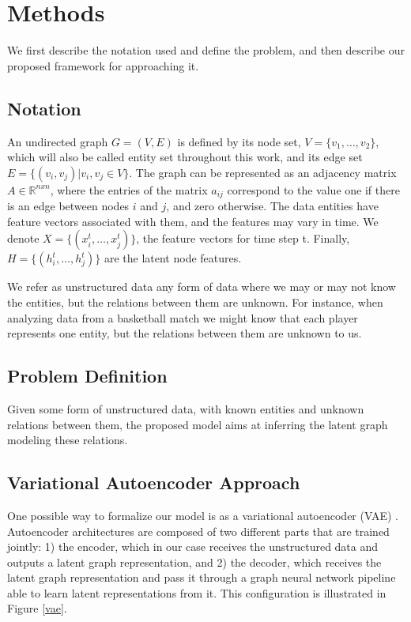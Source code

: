 \documentclass[12pt,a4paper]{article}
\begin{document}
	\section{Methods}
	\label{sec:Methods}
	
	We first describe the notation used and define the problem, and then describe our proposed framework for approaching it.
	
	\subsection{Notation}
	
	An undirected graph $G = (V,E)$ is defined by its node set, $V=\{v_1, \ldots, v_2 \}$, which will also be called entity set throughout this work, and its edge set $E=\{(v_i, v_j)|v_i, v_j \in V\}$. The graph can be represented as an adjacency matrix $A \in \mathbb{R}^{nxn}$, where the entries of the matrix $a_{ij}$  correspond to the value one if there is an edge between nodes $i$ and $j$, and zero otherwise. The data entities have feature vectors associated with them, and the features may vary in time. We denote $X=\{(x^t_i, \ldots , x^t_j)\}$, the feature vectors for time step t. Finally, $H=\{(h^t_i, \ldots , h^t_j)\}$ are the latent node features.
	
	We refer as unstructured data any form of data where we may or may not know the entities, but the relations between them are unknown. For instance, when analyzing data from a basketball match we might know that each player represents one entity, but the relations between them are unknown to us.
	
	\subsection{Problem Definition}
	
	Given some form of unstructured data, with known entities and unknown relations between them, the proposed model aims at inferring the latent graph modeling these relations. 
	
	\subsection{Variational Autoencoder Approach}
	
	One possible way to formalize our model is as a variational autoencoder (VAE) \citep{KingmaandWelling2013, Rezende2014}. Autoencoder architectures are composed of two different parts that are trained jointly: 1) the encoder, which in our case receives the unstructured data and outputs a latent graph representation, and 2) the decoder, which receives the latent graph representation and pass it through a graph neural network pipeline able to learn latent representations from it. This configuration is illustrated in Figure \ref{vae}.
	
\end{document}
